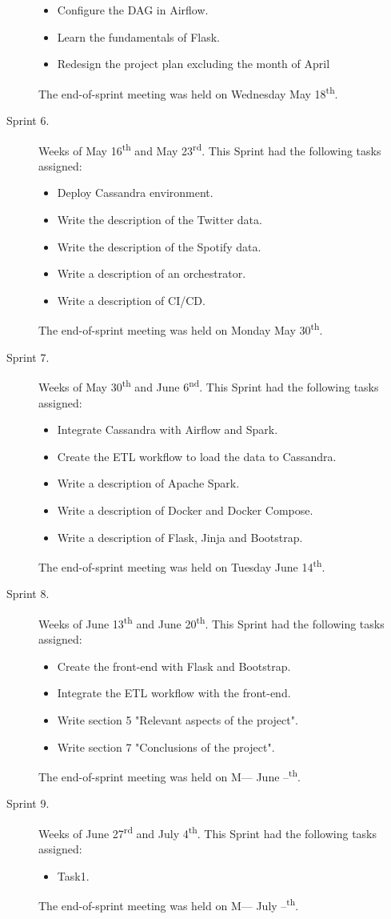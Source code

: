 \begin{description}
	\begin{itemize}
		\item Configure the DAG in Airflow.
		\item Learn the fundamentals of Flask.
		\item Redesign the project plan excluding the month of April
	\end{itemize}
	The end-of-sprint meeting was held on Wednesday May 18\textsuperscript{th}.
	\item[Sprint 6.] Weeks of May 16\textsuperscript{th} and May 23\textsuperscript{rd}. This Sprint had the following tasks assigned:
	\begin{itemize}
		\item Deploy Cassandra environment.
		\item Write the description of the Twitter data.
		\item Write the description of the Spotify data.
		\item Write a description of an orchestrator.
		\item Write a description of CI/CD.
	\end{itemize}
	The end-of-sprint meeting was held on Monday May 30\textsuperscript{th}.
	\item[Sprint 7.] Weeks of May 30\textsuperscript{th} and June 6\textsuperscript{nd}. This Sprint had the following tasks assigned:
	\begin{itemize}
		\item Integrate Cassandra with Airflow and Spark.
		\item Create the ETL workflow to load the data to Cassandra.
		\item Write a description of Apache Spark.
		\item Write a description of Docker and Docker Compose.
		\item Write a description of Flask, Jinja and Bootstrap.
	\end{itemize}
	The end-of-sprint meeting was held on Tuesday June 14\textsuperscript{th}.
	\item[Sprint 8.] Weeks of June 13\textsuperscript{th} and June 20\textsuperscript{th}. This Sprint had the following tasks assigned:
	\begin{itemize}
		\item Create the front-end with Flask and Bootstrap.
		\item Integrate the ETL workflow with the front-end.
		\item Write section 5 "Relevant aspects of the project".
		\item Write section 7 "Conclusions of the project".
	\end{itemize}
	The end-of-sprint meeting was held on M--- June --\textsuperscript{th}.
	\item[Sprint 9.] Weeks of June 27\textsuperscript{rd} and July 4\textsuperscript{th}. This Sprint had the following tasks assigned:
	\begin{itemize}
		\item Task1.
	\end{itemize}
	The end-of-sprint meeting was held on M--- July --\textsuperscript{th}.
\end{description}

